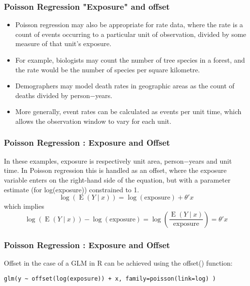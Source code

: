 \documentclass[MASTER.tex]{subfiles}
\begin{document}
	
\begin{frame}
\frametitle{Poisson Regression "Exposure" and offset}
\begin{itemize}
\item Poisson regression may also be appropriate for rate data, where the rate is a count of events occurring to a particular unit of observation, divided by some measure of that unit's exposure. 
\item For example, biologists may count the number of tree species in a forest, and the rate would be the number of species per square kilometre. 
\item Demographers may model death rates in geographic areas as the count of deaths divided by person−years. 
\item More generally, event rates can be calculated as events per unit time, which allows the observation window to vary for each unit. 
\end{itemize}
\end{frame}
\begin{frame}
	\frametitle{Poisson Regression : Exposure and Offset}
	\Large
In these examples, exposure is respectively unit area, person−years and unit time. In Poisson regression this is handled as an offset, where the exposure variable enters on the right-hand side of the equation, but with a parameter estimate (for log(exposure)) constrained to 1.
\[\log{(\operatorname{E}(Y\mid x))} = \log{(\text{exposure})} + \theta' x\]
which implies
\[\log{(\operatorname{E}(Y\mid x))} - \log{(\text{exposure})} = 
       \log{\left(\frac{\operatorname{E}(Y\mid x)}{\text{exposure}}\right)} = \theta' x\]
\end{frame}
\begin{frame}[fragile]
\frametitle{Poisson Regression : Exposure and Offset}
\Large
Offset in the case of a GLM in R can be achieved using the offset() function:

\begin{framed}
\begin{verbatim}
glm(y ~ offset(log(exposure)) + x, family=poisson(link=log) )
\end{verbatim}
\end{framed}

\end{frame}
\end{document}

